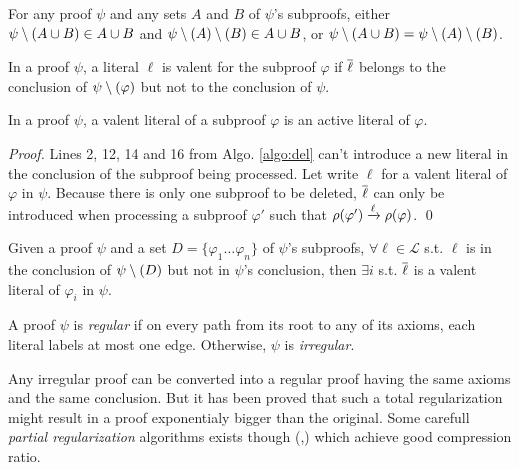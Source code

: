 \documentclass{llncs}
\begin{document}
\begin{proposition} \label{prop:del_assoc}
For any proof $\psi$ and any sets $A$ and $B$ of $\psi$'s subproofs,
either $\psi \setminus (A \cup B)  \in A \cup B$
and    $\psi \setminus (A) \setminus (B) \in A \cup B$,
or     $\psi \setminus (A \cup B) = \psi \setminus (A) \setminus (B)$.
\end{proposition}


\begin{definition}
In a proof $\psi$, a literal $\ell$ is valent for the subproof $\varphi$ if $\overline{\ell}$ belongs to
the conclusion of $\psi \setminus (\varphi)$ but not to the conclusion of $\psi$.
\end{definition}

\begin{proposition} \label{prop:valentactive}
In a proof $\psi$, a valent literal of a subproof $\varphi$ is an active literal of $\varphi$.
\end{proposition}

\begin{proof}
Lines 2, 12, 14 and 16 from Algo. \ref{algo:del} can't introduce a new literal in the conclusion of
the subproof being processed. Let write $\ell$ for a valent literal of $\varphi$ in $\psi$. Because
there is only one subproof to be deleted, $\overline{\ell}$ can only be introduced when processing a
subproof $\varphi'$ such that $\rho(\varphi') \xrightarrow{\ell} \rho(\varphi)$. \qed
\end{proof}

\begin{proposition}
Given a proof $\psi$ and a set $D = \{\varphi_1 \ldots \varphi_n\}$ of $\psi$'s subproofs, $\forall
\ell \in \mathcal{L}$ s.t. $\ell$ is in the conclusion of $\psi \setminus (D)$ but not in $\psi$'s
conclusion, then $\exists i$ s.t. $\overline{\ell}$ is a valent literal of $\varphi_i$ in $\psi$.
\end{proposition}

\begin{definition}
A proof $\psi$ is \emph{regular} if on every path from its root to any of its axioms, each literal
labels at most one edge. Otherwise, $\psi$ is \emph{irregular}.
\end{definition}

Any irregular proof can be converted into a regular proof having the same axioms and the same
conclusion. But it has been proved \cite{Tseitin} that such a total regularization might result in a
proof exponentialy bigger than the original. Some carefull \emph{partial regularization} algorithms
exists though (\cite{RP},\cite{LURPI}) which achieve good compression ratio.
\end{document}
